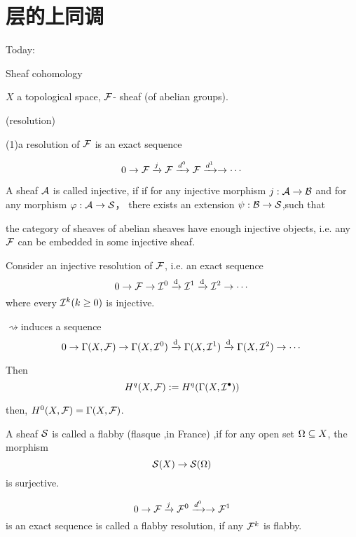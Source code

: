 \section{层的上同调}
Today:

Sheaf cohomology

$X$ a topological space, $\mathcal{F}$- sheaf (of abelian groups).

\begin{definition}  (resolution)

(1)a resolution of $\mathcal{F}$ is an exact sequence

$$0\to \mathcal{F}\xrightarrow{j}\mathcal{F}\xrightarrow{d^0}\mathcal{F}\xrightarrow{d^1}\to\cdots$$

\end{definition}

\begin{definition}
A sheaf $\mathcal{A}$ is called injective, if
if for any injective morphism $j:\mathcal{A}\to \mathcal{B}$
and for any morphism $\varphi:\mathcal{A}\to\mathcal{S}$，
there exists an extension $\psi :\mathcal{B}\to \mathcal{S}$,such that
\end{definition}
\begin{thm}
the category of sheaves of abelian sheaves have enough
injective objects, i.e.  any $\mathcal{F}$ can be
embedded in some injective sheaf.
\end{thm}

\begin{definition}
Consider an injective resolution of $\mathcal{F}$, i.e. an exact sequence
$$0\to\mathcal{F}\to\mathcal{I}^0\xrightarrow{\mathrm{d}}\mathcal{I}^1\xrightarrow{\mathrm{d}}\mathcal{I}^2\to\cdots$$
where every $\mathcal{I}^k(k\geq 0)$ is injective.


$\rightsquigarrow $induces a sequence
$$0\to\Gamma(X,\mathcal{F})
\to\Gamma(X,\mathcal{I}^0)\xrightarrow{\mathrm{d}}
\Gamma(X,\mathcal{I}^1)\xrightarrow{\mathrm{d}}
\Gamma(X,\mathcal{I}^2)\to\cdots$$

Then
$$H^q(X,\mathcal{F}):=H^q(\Gamma(X,\mathcal{I}^{\bullet}))$$

\end{definition}

then, $H^0(X,\mathcal{F})=\Gamma(X,\mathcal{F})$.

\begin{definition}
A sheaf $\mathcal{S}$ is called a flabby (flasque ,in France) ,if
for any open set $\Omega\subseteq X$, the morphism
$$\mathcal{S}(X)\to\mathcal{S}(\Omega)$$
is surjective.
\end{definition}

\begin{definition}
$$0\to\mathcal{F}\xrightarrow{j}\mathcal{F}^0\xrightarrow{d^0}\to\mathcal{F}^1$$
is an exact sequence is called a flabby resolution, if
any $\mathcal{F}^k$ is flabby.
\end{definition}

